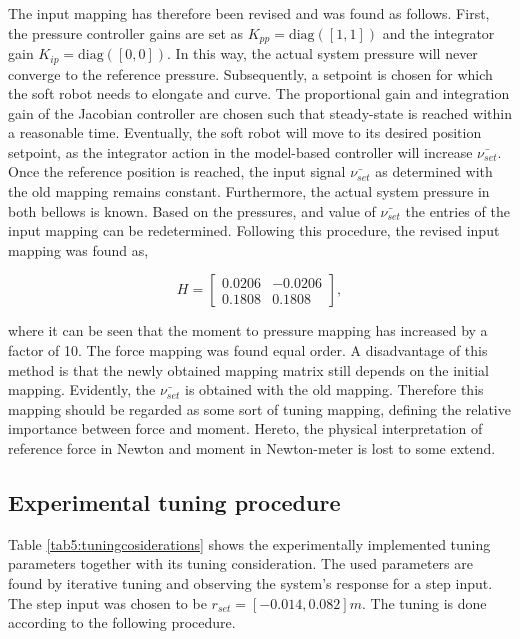 The input mapping has therefore been revised and was found as follows. First, the pressure controller gains are set as $K_{pp} =\text{diag}([1,1])$ and the integrator gain $K_{ip} = \text{diag}([0,0])$. In this way, the actual system pressure will never converge to the reference pressure. Subsequently, a setpoint is chosen for which the soft robot needs to elongate and curve. The proportional gain and integration gain of the Jacobian controller are chosen such that steady-state is reached within a reasonable time. Eventually, the soft robot will move to its desired position setpoint, as the integrator action in the model-based controller will increase $\bar{\nu_{set}}$. Once the reference position is reached, the input signal $\bar{\nu_{set}}$ as determined with the old mapping remains constant. Furthermore, the actual system pressure in both bellows is known. Based on the pressures, and value of $\bar{\nu_{set}}$ the entries of the input mapping can be redetermined. Following this procedure, the revised input mapping was found as,

\begin{equation}
    H = \begin{bmatrix} 	0.0206 &  -0.0206 \\ 
	0.1808 & 0.1808 \end{bmatrix},
    \label{eq4:revisedH}
\end{equation}

where it can be seen that the moment to pressure mapping has increased by a factor of 10. The force mapping was found equal order. A disadvantage of this method is that the newly obtained mapping matrix still depends on the initial mapping. Evidently, the $\bar{\nu_{set}}$ is obtained with the old mapping. Therefore this mapping should be regarded as some sort of tuning mapping, defining the relative importance between force and moment. Hereto, the physical interpretation of reference force in Newton and moment in Newton-meter is lost to some extend. 

\subsection*{Experimental tuning procedure}


Table \ref{tab5:tuningcosiderations} shows the experimentally implemented tuning parameters together with its tuning consideration. The used parameters are found by iterative tuning and observing the system's response for a step input. The step input was chosen to be $r_{set} = [-0.014,0.082]m$. The tuning is done according to the following procedure.

